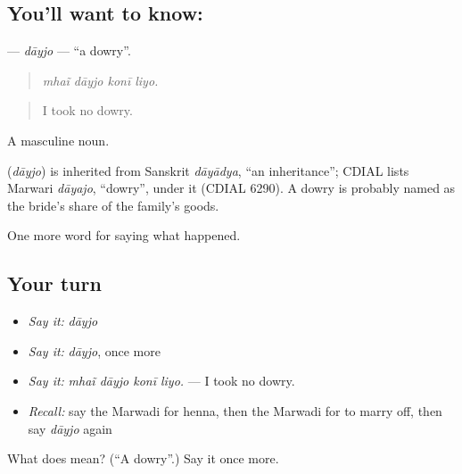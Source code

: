 \subsection*{You'll want to know: }
\textbf{} — \emph{dāyjo} — \textquotedblleft{}a dowry\textquotedblright{}.

\begin{quote}
   
\end{quote}

\begin{quote}
\emph{mhaĩ dāyjo konī liyo.}
\end{quote}

\begin{quote}
I took no dowry.
\end{quote}

A masculine noun.

\begin{cousinweb}
\textbf{} (\emph{dāyjo}) is inherited from Sanskrit \emph{dāyādya}, \textquotedblleft{}an inheritance\textquotedblright{}; CDIAL lists Marwari \emph{dāyajo}, \textquotedblleft{}dowry\textquotedblright{}, under it (CDIAL 6290). A dowry is probably named as the bride's share of the family's goods.
\end{cousinweb}

\begin{grammarlens}[title={What you've built}]
One more word for saying what happened.
\end{grammarlens}

\subsection*{Your turn}
\begin{itemize}
\raggedright
  \item \emph{Say it:} \emph{dāyjo}
  \item \emph{Say it:} \emph{dāyjo}, once more
  \item \emph{Say it:} \emph{mhaĩ dāyjo konī liyo.} — I took no dowry.
  \item \emph{Recall:} say the Marwadi for henna, then the Marwadi for to marry off, then say \emph{dāyjo} again
\end{itemize}

\begin{tcolorbox}[breakable,colback=teal!4,colframe=teal!35!black,title={Before you move on}]
What does  mean? (\textquotedblleft{}A dowry\textquotedblright{}.) Say it once more.
\end{tcolorbox}
